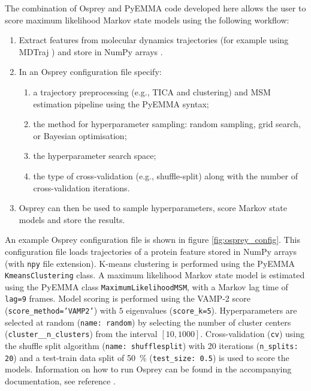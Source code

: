 The combination of Osprey and PyEMMA code developed here allows the user to score  maximum likelihood Markov state models using the following workflow: 
\begin{enumerate}
    \item Extract features from molecular dynamics trajectories (for example using MDTraj \cite{mcgibbonMDTrajModernOpen2015}) and store in NumPy arrays \cite{waltNumPyArrayStructure2011}.
    \item In an Osprey configuration file specify:
    \begin{enumerate}
        \item a trajectory preprocessing (e.g., TICA and clustering) and MSM estimation pipeline using the PyEMMA syntax;
        \item the method for hyperparameter sampling: random sampling, grid search, or Bayesian optimisation;
        \item the hyperparameter search space;
        \item the type of cross-validation (e.g., shuffle-split) along with the number of cross-validation iterations. 
    \end{enumerate}
    \item Osprey can then be used to sample hyperparameters, score Markov state models and store the results. 
\end{enumerate}

An example Osprey configuration file is shown in figure \ref{fig:osprey_config}.  This configuration file loads trajectories of a protein feature stored in NumPy \cite{waltNumPyArrayStructure2011} arrays (with \texttt{npy} file extension). K-means clustering is performed using the PyEMMA \texttt{KmeansClustering} class.  A maximum likelihood Markov state model is estimated using the PyEMMA class \texttt{MaximumLikelihoodMSM},  with a Markov lag time of \texttt{lag=9} frames. Model scoring is performed using the VAMP-2 score (\texttt{score\_method='VAMP2'}) with $5$ eigenvalues (\texttt{score\_k=5}). Hyperparameters are selected at random (\texttt{name: random}) by selecting the number of cluster centers (\texttt{cluster\_\_n\_clusters}) from the interval $[10, 1000]$. Cross-validation (\texttt{cv}) using the shuffle split algorithm (\texttt{name: shufflesplit}) with 20 iterations (\texttt{n\_splits: 20}) and a test-train data split of \SI{50}{\percent} (\texttt{test\_size: 0.5}) is used to score the models.  Information on how to run Osprey can be found in the accompanying documentation, see reference \cite{mcgibbonOspreyHyperparameterOptimization2016}. 


